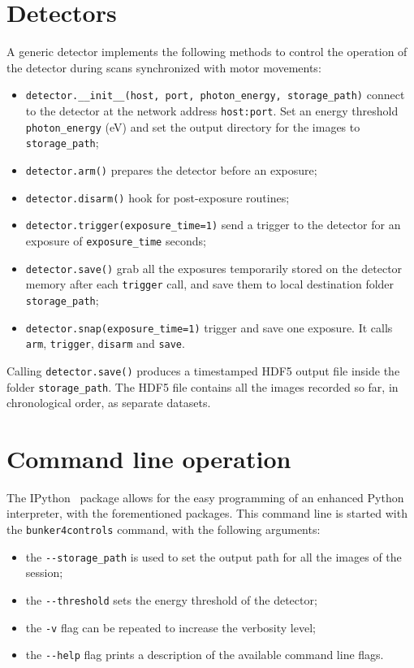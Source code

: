 \section{Detectors}
A generic detector implements the following methods to control the operation
of the detector during scans synchronized with motor movements:
\begin{itemize}
    \item \verb|detector.__init__(host, port, photon_energy, storage_path)|
        connect to the detector at the network address \texttt{host:port}.
        Set an energy threshold \texttt{photon\_energy} (\si{\eV}) and set the
        output directory for the images to \texttt{storage\_path};
    \item \verb|detector.arm()| prepares the detector before an exposure;
    \item \verb|detector.disarm()| hook for post-exposure routines;
    \item \verb|detector.trigger(exposure_time=1)| send a trigger to the
        detector for an exposure of \texttt{exposure\_time} seconds;
    \item \verb|detector.save()| grab all the exposures temporarily stored
        on the detector memory after each \texttt{trigger} call, and save
        them to local destination folder \texttt{storage\_path};
    \item \verb|detector.snap(exposure_time=1)| trigger and save one
        exposure. It calls \texttt{arm}, \texttt{trigger}, \texttt{disarm} and
        \texttt{save}.
\end{itemize}

Calling \texttt{detector.save()} produces a timestamped HDF5 output file inside the
folder \texttt{storage\_path}. The HDF5 file contains all the images
recorded so far, in chronological order, as separate datasets.

\section{Command line operation}
The IPython~\cite{PER-GRA:2007} package allows for the easy programming of
an enhanced Python interpreter, with the forementioned packages. This
command line is started with the \texttt{bunker4controls} command, with
the following arguments:

\begin{itemize}
    \item the \verb|--storage_path| is used to set the output path for all the images
of the session;
    \item the \verb|--threshold| sets the energy threshold of the detector;
    \item the \verb|-v| flag can be repeated to increase the verbosity
        level;
    \item the \verb|--help| flag prints a description of the available command line
        flags.
\end{itemize}

